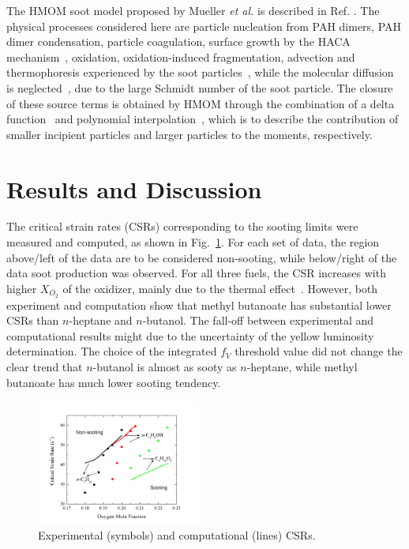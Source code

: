 \documentclass[review,3p,times]{elsarticleUS}
\begin{document}
The HMOM soot model proposed by Mueller \emph{et al.} is described in Ref. \cite{mueller09a,mueller09b,mueller11a}. The physical processes considered here are particle nucleation from PAH dimers, PAH dimer condensation, particle coagulation, surface growth by the HACA mechanism~\cite{frenklach02,frenklach91}, oxidation, oxidation-induced fragmentation, advection and thermophoresis experienced by the soot particles~\cite{waldmann66}, while the molecular diffusion is neglected~\cite{bisetti11}, due to the large Schmidt number of the soot particle. The closure of these source terms is obtained by HMOM through the combination of a delta function~\cite{marchisio05} and polynomial interpolation~\cite{frenklach87}, which is to describe the contribution of smaller incipient particles and larger particles to the moments, respectively.        


\section{Results and Discussion}

The critical strain rates (CSRs) corresponding to the sooting limits were measured and computed, as shown in Fig.~\ref{fig:Exp-Comp}. For each set of data, the region above/left of the data are to be considered non-sooting, while below/right of the data soot production was observed. For all three fuels, the CSR increases with higher $X_{O_2}$ of the oxidizer, mainly due to the thermal effect~\cite{du91}. However, both experiment and computation show that methyl butanoate has substantial lower CSRs than $n$-heptane and $n$-butanol. The fall-off between experimental and computational results might due to the uncertainty of the yellow luminosity determination. The choice of the integrated $f_V$ threshold value did not change the clear trend that $n$-butanol is almost as sooty as $n$-heptane, while methyl butanoate has much lower sooting tendency.

\begin{figure}[h]
  \centering
  \scriptsize
  \vspace{-0.1in}
  \includegraphics[width=0.48\textwidth]{Exp-Comp.png}
  \normalsize
  \vspace{-0.2in}
  \caption{Experimental (symbols) and computational (lines) CSRs. }
  \label{fig:Exp-Comp}
\end{figure}
\end{document}
